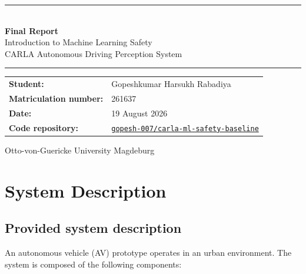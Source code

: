 \documentclass[nologo,a4paper,12pt]{article}
\begin{document}
\begin{titlepage}
\thispagestyle{empty}
\centering
\vspace*{2.1cm}
{
\color{mls@blue}\rule{\linewidth}{2pt}}\\[1.2em]
{\color{mls@blue}\Huge\bfseries Final Report}\\[0.8em]
{\LARGE Introduction to Machine Learning Safety}\\[0.6em]
{\large\color{mls@gray}CARLA Autonomous Driving Perception System}\\[1.2em]
{\color{mls@blue}\rule{\linewidth}{2pt}}

\vspace{2.6cm}
\begin{tabularx}{\linewidth}{@{}l X@{}}
  \textbf{Student:} & Gopeshkumar Harsukh Rabadiya \\[1.0em]
  \textbf{Matriculation number:} & 261637 \\[1.0em]
  \textbf{Date:} & 19 August 2026 \\[1.0em]
  \textbf{Code repository:} &
  \href{https://github.com/gopesh-007/carla-ml-safety-baseline}{
  \texttt{gopesh-007/carla-ml-safety-baseline}} \\
\end{tabularx}

\vfill
{\color{mls@gray}\small Otto-von-Guericke University Magdeburg}
\end{titlepage}

\clearpage
\tableofcontents

\clearpage
\section{System Description}
\label{sec:system-description}

\subsection{Provided system description}

An autonomous vehicle (AV) prototype operates in an urban environment. The system is
composed of the following components:
\end{document}
